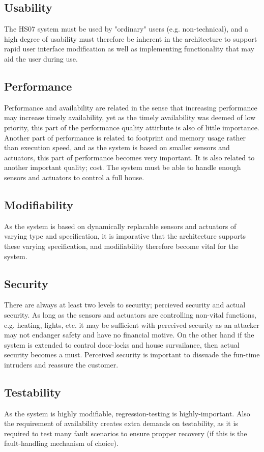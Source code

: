 \documentclass[a4paper,10pt]{article}
\begin{document}
\subsection{Usability}
The HS07 system must be used by "ordinary" users (e.g. non-technical), and a high degree of usability must therefore be inherent in the architecture to support rapid user interface modification as well as implementing functionality that may aid the user during use.
\subsection{Performance}
Performance and availability are related in the sense that increasing performance may increase timely availability, yet as the timely availability was deemed of low priority, this part of the performance quality attirbute is also of little importance.
Another part of performance is related to footprint and memory usage rather than execution speed, and as the system is based on smaller sensors and actuators, this part of performance becomes very important. It is also related to another important quality; cost.
The system must be able to handle enough sensors and actuators to control a full house.
\subsection{Modifiability}
As the system is based on dynamically replacable sensors and actuators of varying type and specification, it is imparative that the architecture supports these varying specification, and modifiability therefore become vital for the system.
\subsection{Security}
There are always at least two levels to security; percieved security and actual security. As long as the sensors and actuators are controlling non-vital functions, e.g. heating, lights, etc. it may be sufficient with perceived security as an attacker may not endanger safety and have no financial motive. On the other hand if the system is extended to control door-locks and house survailance, then actual security becomes a must. Perceived security is important to dissuade the fun-time intruders and reassure the customer.
\subsection{Testability}
As the system is highly modifiable, regression-testing is highly-important. Also the requirement of availability creates extra demands on testability, as it is required to test many fault scenarios to ensure propper recovery (if this is the fault-handling mechanism of choice).
\end{document}
